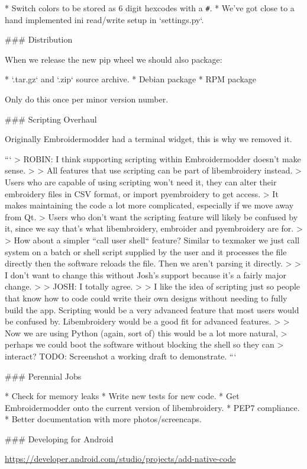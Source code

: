 * Switch colors to be stored as 6 digit hexcodes with a \texttt{\#}.
* We've got close to a hand implemented ini read/write setup in `settings.py`.

### Distribution

When we release the new pip wheel we should also package:

* `.tar.gz` and `.zip` source archive.
* Debian package
* RPM package

Only do this once per minor version number.

### Scripting Overhaul

Originally Embroidermodder had a terminal widget, this is why we removed it.

```
> ROBIN: I think supporting scripting within Embroidermodder doesn't make sense.
> 
> All features that use scripting can be part of libembroidery instead.
> Users who are capable of using scripting won't need it, they can alter their embroidery files in CSV format, or import pyembroidery to get access.
> It makes maintaining the code a lot more complicated, especially if we move away from Qt.
> Users who don't want the scripting feature will likely be confused by it, since we say that's what libembroidery, embroider and pyembroidery are for.
> 
> How about a simpler ``call user shell`` feature? Similar to texmaker we just call system on a batch or shell script supplied by the user and it processes the file directly then the software reloads the file. Then we aren't parsing it directly.
> 
> I don't want to change this without Josh's support because it's a fairly major change.
>
> JOSH: I totally agree.
> 
> I like the idea of scripting just so people that know how to code could write their own designs without needing to fully build the app. Scripting would be a very advanced feature that most users would be confused by. Libembroidery would be a good fit for advanced features.
> 
> Now we are using Python (again, sort of) this would be a lot more natural,
> perhaps we could boot the software without blocking the shell so they can
> interact? TODO: Screenshot a working draft to demonstrate.
```

### Perennial Jobs

* Check for memory leaks
* Write new tests for new code.
* Get Embroidermodder onto the current version of libembroidery.
* PEP7 compliance.
* Better documentation with more photos/screencaps.

### Developing for Android

\url{https://developer.android.com/studio/projects/add-native-code}

